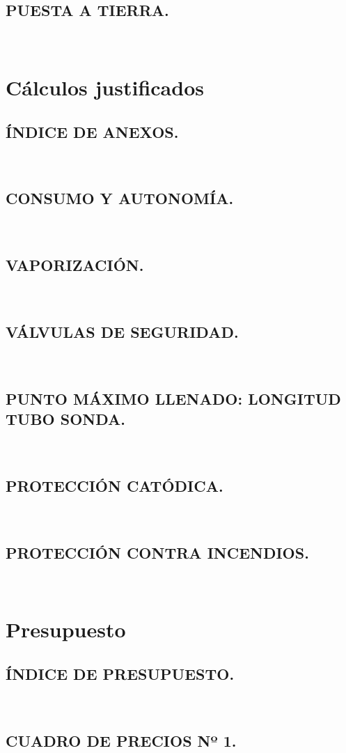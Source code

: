 \documentclass[12pt]{article}
\begin{document}
        \subsection{PUESTA A TIERRA.}
        ~

    \section{Cálculos justificados}
    \label{Cálculos Justificados}
        \subsection{ÍNDICE DE ANEXOS.}
        ~
        \subsection{CONSUMO Y AUTONOMÍA.}
        ~
        \subsection{VAPORIZACIÓN.}
        ~
        \subsection{VÁLVULAS DE SEGURIDAD.}
        ~
        \subsection{PUNTO MÁXIMO LLENADO: LONGITUD TUBO SONDA.}
        ~
        \subsection{PROTECCIÓN CATÓDICA.}
        ~
        \subsection{PROTECCIÓN CONTRA INCENDIOS.}
        ~


    \section{Presupuesto}
    \label{Presupuesto}
        \subsection{ÍNDICE DE PRESUPUESTO.}
        ~
        \subsection{CUADRO DE PRECIOS Nº 1.}
        ~
\end{document}
